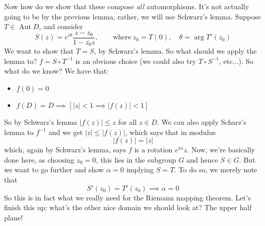 \documentclass{article}
\DeclareMathOperator{\Aut}{Aut}
\DeclareMathOperator{\Arg}{arg}
\begin{document}
Now how do we show that these compose \textit{all} automorphisms. It's not actually going to be by the previous lemma, rather, we will use Schwarz's lemma. Suppose \(T \in \Aut D\), and consider
\[S(z) = e^{i\theta}\frac{z - z_0}{1 - \bar{z_0}z}, \qquad \text{where} \ z_0 = T(0), \quad \theta = \Arg T'(z_0)\]
We want to show that \(T = S\), by Schwarz's lemma. So what should we apply the lemma to? \(f = S \circ T^{-1}\) is an obvious choice (we could also try \(T \circ S^{-1}\), etc...). So what do we know? We have that:
\begin{itemize}

  \item \(f(0) = 0\)

  \item \(f(D) = D \implies [|z| < 1 \implies |f(z)| < 1]\)

\end{itemize}
So by Schwarz's lemma \(|f(z)| \leq z\) for all \(z \in D\). We can also apply Scharz's lemma to \(f^{-1}\) and we get \(|z| \leq |f(z)|\), which says that in modulus
\[|f(z)| = |z|\]
which, again by Schwarz's lemma, says \(f\) is a rotation \(e^{i\alpha}z\). Now, we're basically done here, as choosing \(z_0 = 0\), this lies in the subgroup \(G\) and hence \(S \in G\). But we want to go further and show \(\alpha = 0\) implying \(S = T\). To do so, we merely note that
\[S'(z_0) = T'(z_0) \implies \alpha = 0\]
So this is in fact what we really need for the Riemann mapping theorem. Let's finish this up: what's the other nice domain we should look at? The upper half plane!
\end{document}

